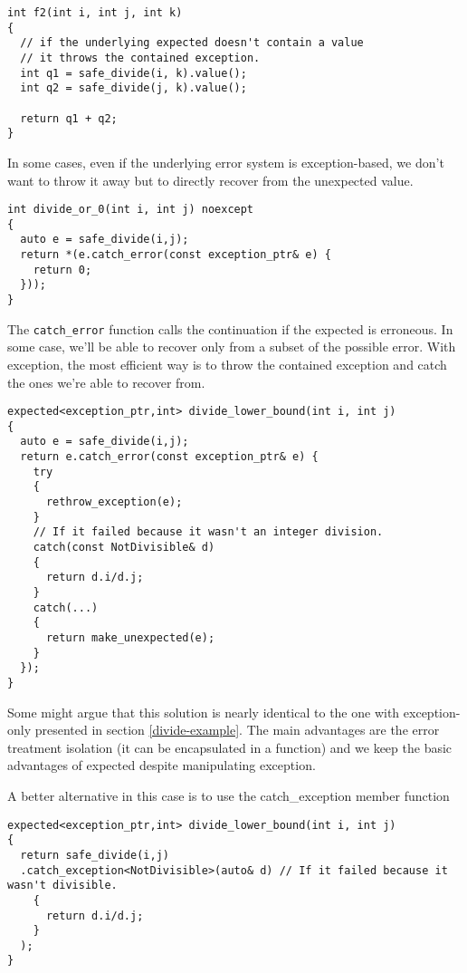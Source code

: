 \documentclass[a4paper,10pt]{article}
\newcommand{\cpp}[1]{\lstinline{#1}}
\begin{document}
\begin{lstlisting}
int f2(int i, int j, int k)
{
  // if the underlying expected doesn't contain a value
  // it throws the contained exception.
  int q1 = safe_divide(i, k).value();
  int q2 = safe_divide(j, k).value();

  return q1 + q2;
}
\end{lstlisting}

In some cases, even if the underlying error system is exception-based, we don't want to throw it away but to directly recover from the unexpected value. 

\begin{lstlisting}
int divide_or_0(int i, int j) noexcept
{
  auto e = safe_divide(i,j);
  return *(e.catch_error(const exception_ptr& e) {
    return 0;
  }));
}
\end{lstlisting}

The \cpp{catch_error} function calls the continuation if the expected is erroneous. In some case, we'll be able to recover only from a subset of the possible error. With exception, the most efficient way is to throw the contained exception and catch the ones we're able to recover from.

\begin{lstlisting}
expected<exception_ptr,int> divide_lower_bound(int i, int j)
{
  auto e = safe_divide(i,j);
  return e.catch_error(const exception_ptr& e) {
    try
    {
      rethrow_exception(e);
    }
    // If it failed because it wasn't an integer division.
    catch(const NotDivisible& d)
    {
      return d.i/d.j;
    }
    catch(...)
    {
      return make_unexpected(e);
    }
  });
}
\end{lstlisting}

Some might argue that this solution is nearly identical to the one with exception-only presented in section \ref{divide-example}. The main advantages are the error treatment isolation (it can be encapsulated in a function) and we keep the basic advantages of expected despite manipulating exception.

A better alternative in this case is to use the catch_exception member function

\begin{lstlisting}
expected<exception_ptr,int> divide_lower_bound(int i, int j)
{
  return safe_divide(i,j)
  .catch_exception<NotDivisible>(auto& d) // If it failed because it wasn't divisible.
    {
      return d.i/d.j;
    }
  );
}
\end{lstlisting}
\end{document}
